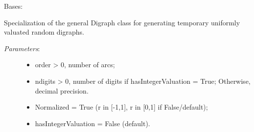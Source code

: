 \documentclass[letterpaper,10pt,english]{sphinxmanual}
\begin{document}

\begin{fulllineitems}
\label{techDoc:digraphs.RandomValuationDigraph}
Bases: {\hyperref[techDoc:digraphs.Digraph]{}}

Specialization of the general Digraph class for generating
temporary uniformly valuated random digraphs.
\begin{description}
\item[{\emph{Parameters}:}] \leavevmode\begin{itemize}
\item {} 
order \textgreater{} 0, number of arcs;

\item {} 
ndigits \textgreater{} 0, number of digits if hasIntegerValuation = True;
Otherwise, decimal precision.

\item {} 
Normalized = True (r in {[}-1,1{]}, r in {[}0,1{]} if False/default);

\item {} 
hasIntegerValuation = False (default).

\end{itemize}


\end{description}
\end{fulllineitems}
\end{document}
